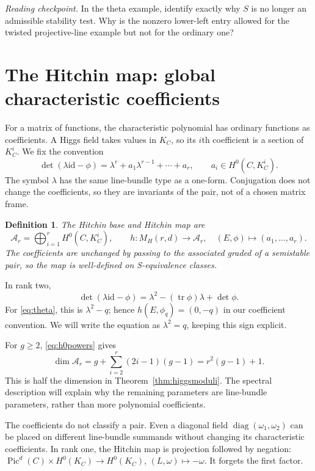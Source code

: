\documentclass[11pt,a4paper]{article}
\numberwithin{equation}{section}
\newtheorem{definition}{Definition}[section]
\theoremstyle{definition}
\newcommand{\Pic}{\operatorname{Pic}}
\newcommand{\tr}{\operatorname{tr}}
\newcommand{\id}{\mathrm{id}}
\newcommand{\reading}[1]{\par\smallskip\textit{Reading checkpoint.} #1\par}
\begin{document}
\reading{In the theta example, identify exactly why $S$ is no longer
an admissible stability test. Why is the nonzero lower-left entry
allowed for the twisted projective-line example but not for the ordinary one?}

\section{The Hitchin map: global characteristic coefficients}
\label{sec:hitchin}

For a matrix of functions, the characteristic polynomial has ordinary
functions as coefficients. A Higgs field takes values in $K_C$, so
its $i$th coefficient is a section of $K_C^i$. We fix the convention
\begin{equation}\label{eq:charpoly}
 \det(\lambda\id-\phi)
 =\lambda^r+a_1\lambda^{r-1}+\cdots+a_r,
 \qquad a_i\in H^0(C,K_C^i).
\end{equation}
The symbol $\lambda$ has the same line-bundle type as a one-form.
Conjugation does not change the coefficients, so they are invariants
of the pair, not of a chosen matrix frame.

\begin{definition}
The Hitchin base and Hitchin map are
\[
 \mathcal A_r=\bigoplus_{i=1}^r H^0(C,K_C^i),\qquad
 h:M_H(r,d)\longrightarrow\mathcal A_r,
 \quad(E,\phi)\longmapsto(a_1,\ldots,a_r).
\]
The coefficients are unchanged by passing to the associated graded of
a semistable pair, so the map is well-defined on S-equivalence classes.
\end{definition}

In rank two,
\[
 \det(\lambda\id-\phi)=\lambda^2-(\tr\phi)\lambda+\det\phi.
\]
For \eqref{eq:theta}, this is $\lambda^2-q$; hence
$h(E,\phi_q)=(0,-q)$ in our coefficient convention. We will write
the equation as $\lambda^2=q$, keeping this sign explicit.

For $g\ge2$, \eqref{eq:h0powers} gives
\[
 \dim\mathcal A_r=g+\sum_{i=2}^r(2i-1)(g-1)
 =r^2(g-1)+1.
\]
This is half the dimension in Theorem~\ref{thm:higgsmoduli}. The
spectral description will explain why the remaining parameters are
line-bundle parameters, rather than more polynomial coefficients.

The coefficients do not classify a pair. Even a diagonal field
$\operatorname{diag}(\omega_1,\omega_2)$ can be placed on different
line-bundle summands without changing its characteristic coefficients.
In rank one, the Hitchin map is projection followed by negation:
$\Pic^d(C)\times H^0(K_C)\to H^0(K_C)$, $(L,\omega)\mapsto-\omega$.
It forgets the first factor.
\end{document}
